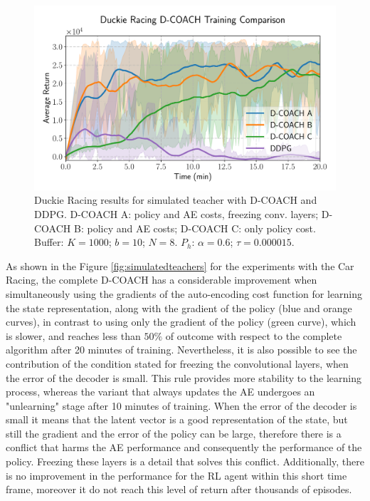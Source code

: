 \begin{figure}[h]
    \centering
    \includegraphics[width=0.9\linewidth]{imagenes/cap3/duckie_sim_ICRA.pdf}
    \caption{Duckie Racing results for simulated teacher with D-COACH and DDPG. D-COACH A: policy and AE costs, freezing conv. layers; D-COACH B: policy and AE costs; D-COACH C: only policy cost. Buffer: $K = 1000$; $b = 10$; $N = 8$. $P_{h}$: $\alpha = 0.6$; $\tau = 0.000015$.}
    \label{fig:racing_car_results}
\end{figure}

As shown in the Figure \ref{fig:simulatedteachers} for the experiments with the Car Racing,  the complete D-COACH has a considerable improvement when simultaneously using  the gradients of the auto-encoding cost function for learning the state representation, along with the gradient of the policy  (blue and orange curves), in contrast to using only the gradient of the policy (green curve), which is slower, and reaches less than $50\%$ of outcome with respect to the complete algorithm after 20 minutes of training. Nevertheless, it is also possible to see the contribution of the condition stated for freezing the convolutional layers, when the error of the decoder is small. This rule provides more stability to the learning process, whereas the variant that always updates the AE undergoes an "unlearning" stage after 10 minutes of training. When the error of the decoder is small it means that the latent vector is a good representation of the state, but still the gradient and the error of the policy can be large, therefore there is a conflict that harms the AE performance and consequently the performance of the policy. Freezing these layers is a detail that solves this conflict. Additionally, there is no improvement in the  performance for the RL agent within this short time frame, moreover it do not reach this level of return after thousands of episodes.

